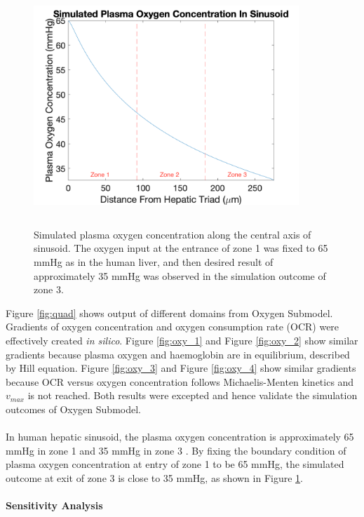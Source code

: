 \documentclass[12pt]{article}
\newcommand{\myparagraph}[1]{\paragraph{#1}\mbox{}\\}
\begin{document}
\begin{figure}[h!]
\centering
\includegraphics[width = 10cm, height = 9cm]{oxy_vali.png}
\caption{Simulated plasma oxygen concentration along the central axis of sinusoid. The oxygen input at the entrance of zone 1 was fixed to 65 mmHg as in the human liver, and then desired result of approximately 35 mmHg was observed in the simulation outcome of zone 3. }
\label{fig:oxy_vali}
\end{figure}
Figure \ref{fig:quad} shows output of different domains from Oxygen Submodel. Gradients of oxygen concentration and oxygen consumption rate (OCR) were effectively created \textit{in silico}. Figure \ref{fig:oxy_1} and Figure \ref{fig:oxy_2} show similar gradients because plasma oxygen and haemoglobin are in equilibrium, described by Hill equation. Figure \ref{fig:oxy_3} and Figure \ref{fig:oxy_4} show similar gradients because OCR versus oxygen concentration follows Michaelis-Menten kinetics and $v_{max}$ is not reached. Both results were excepted and hence validate the simulation outcomes of Oxygen Submodel.\\\\
In human hepatic sinusoid, the plasma oxygen concentration is approximately 65 mmHg in zone 1 and 35 mmHg in zone 3 \cite{jungermannOxygenModulatorMetabolic2000}. By fixing the boundary condition of plasma oxygen concentration at entry of zone 1 to be 65 mmHg, the simulated outcome at exit of zone 3 is close to 35 mmHg, as shown in Figure \ref{fig:oxy_vali}.
\myparagraph{Sensitivity Analysis} \label{section:sens}
\end{document}
